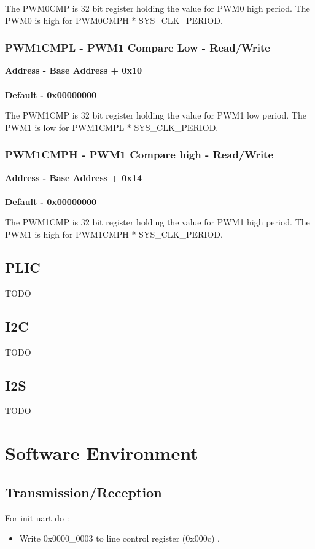 \documentclass[12pt,a4paper]{report}
\begin{document}
The PWM0CMP is 32 bit register holding the value for PWM0 high period. The PWM0 is high for PWM0CMPH * SYS\_CLK\_PERIOD.


\subsection{PWM1CMPL - PWM1 Compare Low - Read/Write}
\hspace{1.6cm}
\textbf{Address - Base Address + 0x10}
\\
\\
\textbf{Default - 0x00000000}

The PWM1CMP is 32 bit register holding the value for PWM1 low period. The PWM1 is low for PWM1CMPL * SYS\_CLK\_PERIOD.

\subsection{PWM1CMPH - PWM1 Compare high - Read/Write}
\hspace{1.6cm}
\textbf{Address - Base Address + 0x14}
\\
\\
\textbf{Default - 0x00000000}

The PWM1CMP is 32 bit register holding the value for PWM1 high period. The PWM1 is high for PWM1CMPH * SYS\_CLK\_PERIOD.

\section{PLIC}
TODO
\section{I2C}
TODO
\section{I2S} 
TODO


\chapter{Software Environment}
\thispagestyle{logo}
\section{Transmission/Reception} 
 
For init uart do :
 \begin{itemize} 
\item Write 0x0000\_0003 to line control register (0x000c) .
\end{itemize}
\end{document}
